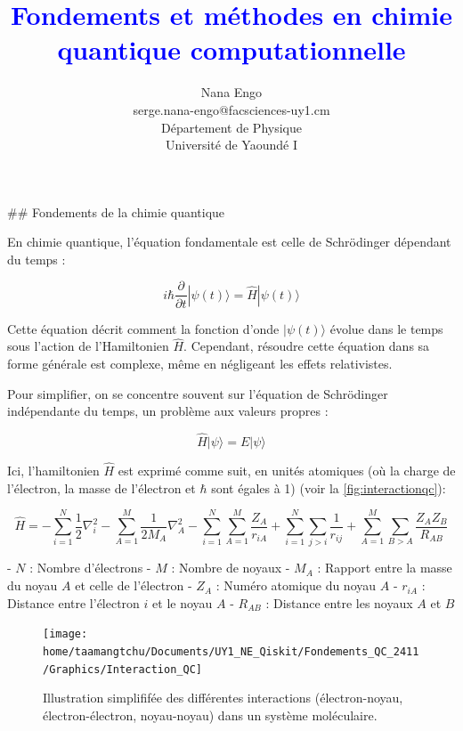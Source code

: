\documentclass[12pt,a4paper]{report}
\title{\textcolor{blue}{Fondements et méthodes en chimie quantique computationnelle}}
\author{Nana Engo\\serge.nana-engo@facsciences-uy1.cm\\
Département de Physique\\ Université de Yaoundé I}
\date{
 \vspace{5cm} %
\begin{center}
\texttt{[image: Neo\_logo.jpg]}
\end{center}
Novembre 2024
}%
\begin{document}
\pagestyle{logo}

\renewcommand{\arraystretch}{1.2}

\maketitle\begin{markdown}


## Fondements de la chimie quantique


En chimie quantique, l'équation fondamentale est celle de Schrödinger dépendant du temps :

\[
i\hbar \frac{\partial}{\partial t} |\psi(t)\rangle = \hat{H} |\psi(t)\rangle
\]

Cette équation décrit comment la fonction d'onde \(|\psi(t)\rangle\) évolue dans le temps sous l'action de l'Hamiltonien \(\hat{H}\). Cependant, résoudre cette équation dans sa forme générale est complexe, même en négligeant les effets relativistes.

Pour simplifier, on se concentre souvent sur l'équation de Schrödinger indépendante du temps, un problème aux valeurs propres :

\[
\hat{H} |\psi\rangle = E |\psi\rangle
\]

Ici, l’hamiltonien \(\hat{H}\) est exprimé comme suit, en unités atomiques (où la charge de l'électron, la masse de l'électron et \(\hbar\) sont égales à 1) (voir la \autoref{fig:interactionqc}):

\[
\hat{H} = -\sum_{i=1}^N \frac{1}{2} \nabla_i^2 - \sum_{A=1}^M \frac{1}{2M_A} \nabla_A^2 - \sum_{i=1}^N \sum_{A=1}^M \frac{Z_A}{r_{iA}} + \sum_{i=1}^N \sum_{j>i} \frac{1}{r_{ij}} + \sum_{A=1}^M \sum_{B>A} \frac{Z_A Z_B}{R_{AB}}
\]

- \(N\) : Nombre d'électrons
- \(M\) : Nombre de noyaux
- \(M_A\) : Rapport entre la masse du noyau \(A\) et celle de l'électron
- \(Z_A\) : Numéro atomique du noyau \(A\)
- \(r_{iA}\) : Distance entre l’électron \(i\) et le noyau \(A\)
- \(R_{AB}\) : Distance entre les noyaux \(A\) et \(B\)

\begin{figure}[tbph]
\centering
\texttt{[image: home/taamangtchu/Documents/UY1\_NE\_Qiskit/Fondements\_QC\_2411/Graphics/Interaction\_QC]}
\caption{Illustration simplififée des différentes interactions (électron-noyau, électron-électron, noyau-noyau) dans un système moléculaire.}
\label{fig:interactionqc}
\end{figure}


\end{markdown}
\end{document}
